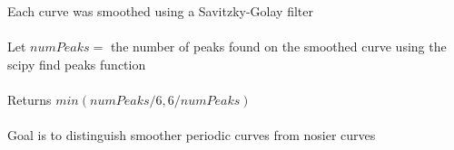 \documentclass[12pt]{article}
\begin{document}
\noindent Each curve was smoothed using a Savitzky-Golay filter\\
\\
Let $numPeaks = $ the number of peaks found on the smoothed curve using the scipy find peaks function\\
\\
Returns $min(numPeaks/6, 6/numPeaks)$\\
\\
Goal is to distinguish smoother periodic curves from nosier curves
\end{document}
